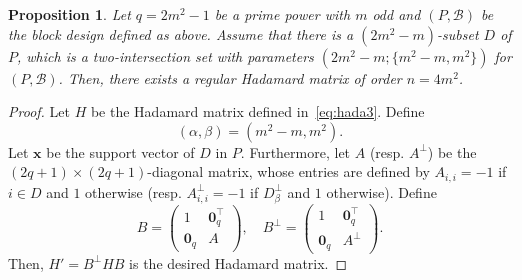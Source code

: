 \documentclass[10pt]{amsart}
\newtheorem{prop}[theo]{Proposition}
\theoremstyle{definition}
\newcommand*\tra{\top}
\newcommand*{\bfx}{\mathbf{x}}
\newcommand*{\bfo}{\mathbf{0}}
\begin{document}
\begin{prop}\label{prop:const5}
Let $q=2m^2-1$ be a prime power with $m$ odd and $(P,{\mathcal B})$ be the block design defined as above. Assume that there is a $(2m^2-m)$-subset $D$ of $P$, which is a two-intersection set with parameters $(2m^2-m;\{m^2-m,m^2\})$ for $(P,{\mathcal B})$. Then, there exists a regular Hadamard matrix of order $n=4m^2$.
\end{prop}
\begin{proof}
Let $H$ be the Hadamard matrix defined in~\eqref{eq:hada3}. Define
\[
(\alpha,\beta)=(m^2-m,m^2).
\]
Let $\bfx$ be the support vector of $D$ in $P$. Furthermore, let $A$ (resp. $A^{\perp}$) be the $(2q+1)\times (2q+1)$-diagonal matrix, whose entries are defined by $A_{i,i}=-1$ if $i\in D$ and $1$ otherwise (resp. $A^\perp_{i,i}=-1$ if $D_{\beta}^\perp$ and $1$ otherwise). Define
\[
B=
\begin{pmatrix} 1 & \bfo_q^\tra \\
\bfo_q & A
\end{pmatrix}, \quad B^\perp=
\begin{pmatrix} 1 & \bfo_q^\tra \\
\bfo_q & A^\perp
\end{pmatrix}.
\]
Then, $H'=B^\perp H B$ is the desired Hadamard matrix.


\end{proof}
\end{document}
